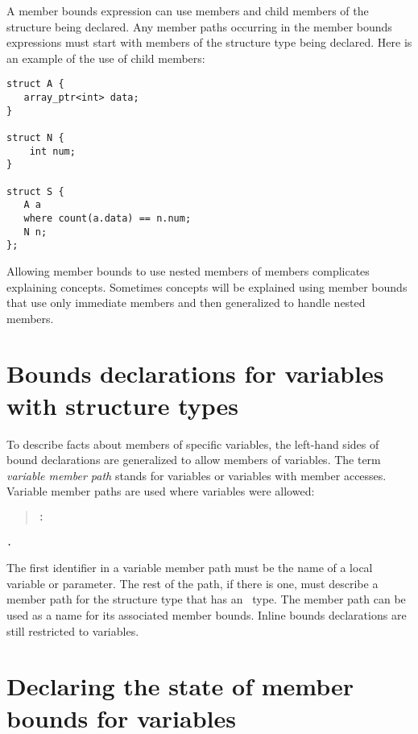 A member bounds expression can use members and child members of the
structure being declared. Any member paths occurring in the member
bounds expressions must start with members of the structure type being
declared. Here is an example of the use of child members:

\begin{verbatim}
struct A {
   array_ptr<int> data;
}

struct N {
    int num;
}

struct S {
   A a
   where count(a.data) == n.num;
   N n;
};
\end{verbatim}

Allowing member bounds to use nested members of members complicates
explaining concepts. Sometimes concepts will be explained using member
bounds that use only immediate members and then generalized to handle
nested members.

\section{Bounds declarations for variables with structure types}\label{bounds-declarations-for-variables-with-structure-types}

To describe facts about members of specific variables, the left-hand
sides of bound declarations are generalized to allow members of
variables. The term \emph{variable member path} stands for variables or
variables with member accesses. Variable member paths are used where
variables were allowed:


\begin{quote}
 \texttt{:} 
\end{quote}



 \texttt{.} 

The first identifier in a variable member path must be the name of a
local variable or parameter. The rest of the path, if there is one, must
describe a member path for the structure type that has an
\arrayptr\ type. The member path can be used as a name for its
associated member bounds. Inline bounds declarations are still
restricted to variables.

\section{Declaring the state of member bounds for variables}\label{declaring-the-state-of-member-bounds-for-variables}

